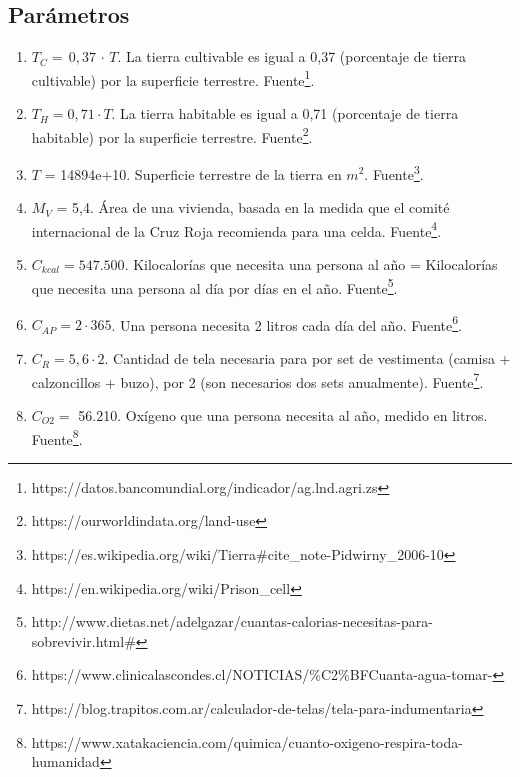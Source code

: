 \documentclass[12pt]{report}
\begin{document}
\subsection*{Par\'ametros}
\begin{enumerate}
    \item $T_{C} =\, 0,37\,  \cdot\,  T$. La tierra cultivable es igual a 0,37 (porcentaje de tierra cultivable) por la superficie terrestre. Fuente\footnote{https://datos.bancomundial.org/indicador/ag.lnd.agri.zs}. 
    
    \item $T_{H} = 0,71 \cdot T$. La tierra habitable es igual a 0,71 (porcentaje de tierra habitable) por la superficie terrestre. Fuente\footnote{https://ourworldindata.org/land-use}. 
    
    \item $T$ = 14894e+10. Superficie terrestre de la tierra en $m^{2}$. Fuente\footnote{https://es.wikipedia.org/wiki/Tierra\#cite\_note-Pidwirny\_2006-10}.
    
    \item $M_{V}$ = 5,4. \'Area de una vivienda, basada en la medida que el comit\'e internacional de la Cruz Roja recomienda para una celda. Fuente\footnote{https://en.wikipedia.org/wiki/Prison\_cell}.
    
    \item $C_{kcal} = 547.500$. Kilocalor\'ias que necesita una persona al a\~no = Kilocalor\'ias que necesita una persona al d\'ia por d\'ias en el a\~no. Fuente\footnote{http://www.dietas.net/adelgazar/cuantas-calorias-necesitas-para-sobrevivir.html\#}.  
    
    \item $C_{AP} = {2\cdot365}$. Una persona necesita 2 litros cada d\'ia del a\~no. Fuente\footnote{https://www.clinicalascondes.cl/NOTICIAS/\%C2\%BFCuanta-agua-tomar-}.
   
    \item $C_{R} = {5,6\cdot2}$. Cantidad de tela necesaria para por set de vestimenta (camisa + calzoncillos + buzo), por 2 (son necesarios dos sets anualmente). Fuente\footnote{https://blog.trapitos.com.ar/calculador-de-telas/tela-para-indumentaria}.
   
    \item $C_{O2} =$ 56.210. Ox\'igeno que una persona necesita al a\~no, medido en litros. Fuente\footnote{https://www.xatakaciencia.com/quimica/cuanto-oxigeno-respira-toda-humanidad}. 
    

\end{enumerate}
\end{document}
